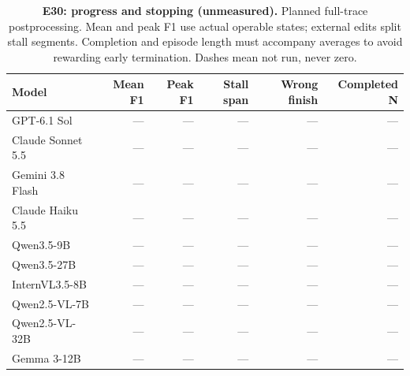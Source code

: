 \begin{table}[!ht]
\centering\small
\caption{\textbf{E30: progress and stopping (unmeasured).} Planned full-trace postprocessing. Mean and peak F1 use actual operable states; external edits split stall segments. Completion and episode length must accompany averages to avoid rewarding early termination. Dashes mean not run, never zero.}
\begin{tabularx}{\textwidth}{@{}Xrrrrr@{}}\toprule
Model & Mean F1 & Peak F1 & Stall span & Wrong finish & Completed N\\\midrule
GPT-6.1 Sol & --- & --- & --- & --- & ---\\
Claude Sonnet 5.5 & --- & --- & --- & --- & ---\\
Gemini 3.8 Flash & --- & --- & --- & --- & ---\\
Claude Haiku 5.5 & --- & --- & --- & --- & ---\\
Qwen3.5-9B & --- & --- & --- & --- & ---\\
Qwen3.5-27B & --- & --- & --- & --- & ---\\
InternVL3.5-8B & --- & --- & --- & --- & ---\\
Qwen2.5-VL-7B & --- & --- & --- & --- & ---\\
Qwen2.5-VL-32B & --- & --- & --- & --- & ---\\
Gemma 3-12B & --- & --- & --- & --- & ---\\
\bottomrule
\end{tabularx}
\end{table}
